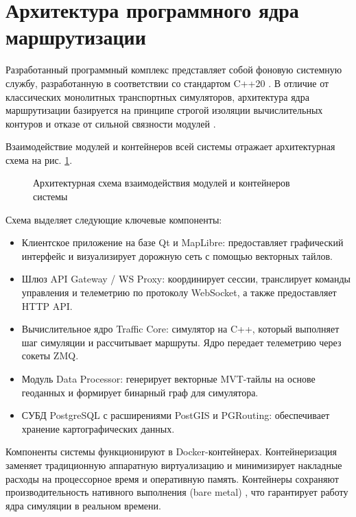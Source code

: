 \section{Архитектура программного ядра маршрутизации}

Разработанный программный комплекс представляет собой фоновую системную службу, разработанную в соответствии со стандартом C++20 \cite{iso_iec_14882_2020}. В отличие от классических монолитных транспортных симуляторов, архитектура ядра маршрутизации базируется на принципе строгой изоляции вычислительных контуров и отказе от сильной связности модулей \cite{butorin2026thread}.

Взаимодействие модулей и контейнеров всей системы отражает архитектурная схема на рис. \ref{fig:system_arch}.

\begin{figure}[htbp]
    \centering
    
    \caption{Архитектурная схема взаимодействия модулей и контейнеров системы}
    \label{fig:system_arch}
\end{figure}

Схема выделяет следующие ключевые компоненты:
\begin{itemize}
    \item Клиентское приложение на базе Qt и MapLibre: предоставляет графический интерфейс и визуализирует дорожную сеть с помощью векторных тайлов.
    \item Шлюз API Gateway / WS Proxy: координирует сессии, транслирует команды управления и телеметрию по протоколу WebSocket, а также предоставляет HTTP API.
    \item Вычислительное ядро Traffic Core: симулятор на C++, который выполняет шаг симуляции и рассчитывает маршруты. Ядро передает телеметрию через сокеты ZMQ.
    \item Модуль Data Processor: генерирует векторные MVT-тайлы на основе геоданных и формирует бинарный граф для симулятора.
    \item СУБД PostgreSQL с расширениями PostGIS и PGRouting: обеспечивает хранение картографических данных.
\end{itemize}

Компоненты системы функционируют в Docker-контейнерах. Контейнеризация заменяет традиционную аппаратную виртуализацию и минимизирует накладные расходы на процессорное время и оперативную память. Контейнеры сохраняют производительность нативного выполнения (bare metal) \cite{felter2014updated}, что гарантирует работу ядра симуляции в реальном времени.

